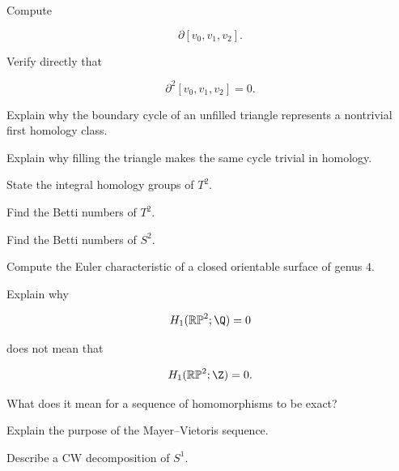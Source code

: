 \begin{exercise}[2]
Compute

\[
\partial[v_0,v_1,v_2].
\]
\end{exercise}

\begin{exercise}[2]
Verify directly that

\[
\partial^2[v_0,v_1,v_2]=0.
\]
\end{exercise}

\begin{exercise}[2]
Explain why the boundary cycle of an unfilled triangle represents a
nontrivial first homology class.
\end{exercise}

\begin{exercise}[2]
Explain why filling the triangle makes the same cycle trivial in homology.
\end{exercise}

\begin{exercise}[2]
State the integral homology groups of \(T^2\).
\end{exercise}

\begin{exercise}[2]
Find the Betti numbers of \(T^2\).
\end{exercise}

\begin{exercise}[2]
Find the Betti numbers of \(S^2\).
\end{exercise}

\begin{exercise}[2]
Compute the Euler characteristic of a closed orientable surface of genus
\(4\).
\end{exercise}

\begin{exercise}[2]
Explain why

\[
H_1(\mathbb{RP}^2;\Q)=0
\]

does not mean that

\[
H_1(\mathbb{RP}^2;\Z)=0.
\]
\end{exercise}

\begin{exercise}[2]
What does it mean for a sequence of homomorphisms to be exact?
\end{exercise}

\begin{exercise}[2]
Explain the purpose of the Mayer--Vietoris sequence.
\end{exercise}

\begin{exercise}[2]
Describe a CW decomposition of \(S^1\).
\end{exercise}


